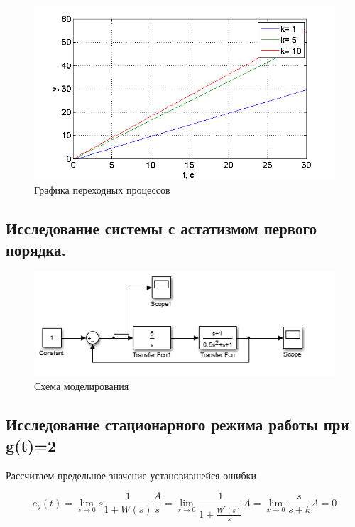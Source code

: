 \documentclass[a4paper, 12pt]{article}
\begin{document}
\begin{figure}[H]
	\centering
	\includegraphics[width=0.7\linewidth]{44}
	\caption{Графика переходных процессов}
	\label{fig:44}
\end{figure}
\clearpage
\begin{center}
\section{Исследование системы с астатизмом первого порядка.}\hfill\par
\end{center}		
	\begin{figure}[h]
	\center\includegraphics[width=0.6\linewidth]{5}
		\caption{Схема моделирования}
		\label{fig:5}
	\end{figure}

\subsection{Исследование стационарного режима работы при g(t)=2}\hfill\par
Рассчитаем предельное значение установившейся ошибки

\begin{equation}
{e_y}(t) = \mathop {\lim }\limits_{s \to 0} s\frac{1}{{1 + W(s)}}\frac{A}{s} = \mathop {\lim }\limits_{s \to 0} \frac{1}{{1 + \frac{{{W^*}(s)}}{s}}}A = \mathop {\lim }\limits_{x \to 0} \frac{s}{{s + k}}A = 0
\end{equation}
\end{document}
